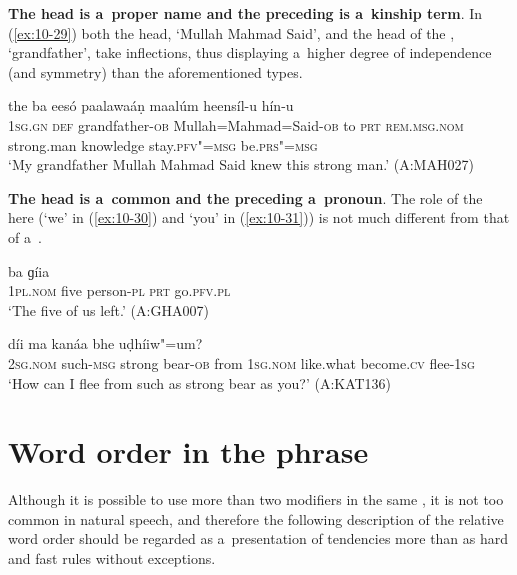 \textbf{The head is a~proper name and the preceding  is a~kinship term}. In (\ref{ex:10-29}) both the  head, `Mullah Mahmad Said', and the head of the , `grandfather', take inflections, thus displaying a~higher degree of independence (and symmetry) than the aforementioned types. 

\begin{exe}
\ex
\label{ex:10-29}
\gll [míi se dóod-a mulaa=mhaamad=seed-á] the ba eesó paalawaáṇ maalúm heensíl-u hín-u \\
\textsc{1sg.gn} \textsc{def} grandfather-\textsc{ob} Mullah=Mahmad=Said-\textsc{ob} to  \textsc{prt} \textsc{rem.msg.nom} strong.man knowledge  stay.\textsc{pfv"=msg} be.\textsc{prs"=msg}  \\
\glt `My grandfather Mullah Mahmad Said knew this strong man.' (A:MAH027)
\end{exe}


\textbf{The head is a~common  and the preceding  a~pronoun}. The role of the  here (`we' in (\ref{ex:10-30}) and `you' in (\ref{ex:10-31})) is not much different from that of a~. 

\begin{exe}
\ex
\label{ex:10-30}
 ba ɡíia \\
\textsc{1pl.nom} five person-\textsc{pl} \textsc{prt} go.\textsc{pfv.pl}  \\
\glt `The five of us left.' (A:GHA007)

\ex
\label{ex:10-31}
 díi ma kanáa bhe uḍhíiw"=um? \\
\textsc{2sg.nom} such-\textsc{msg} strong bear-\textsc{ob} from \textsc{1sg.nom}  like.what become.\textsc{cv} flee-\textsc{1sg} \\
\glt `How can I flee from such as strong bear as you?' (A:KAT136)
\end{exe}

\section{Word order in the  phrase}
\label{sec:10-2}


Although it is possible to use more than two modifiers in the same  , it is not too common in natural speech, and therefore the following description of the relative word order should be regarded as a~presentation of tendencies more than as hard and fast rules without exceptions. 


